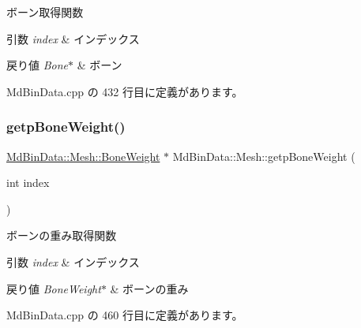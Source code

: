 ボーン取得関数 


\begin{DoxyParams}{引数}
{\em index} & インデックス \\
\hline
\end{DoxyParams}

\begin{DoxyRetVals}{戻り値}
{\em Bone$\ast$} & ボーン \\
\hline
\end{DoxyRetVals}


 Md\+Bin\+Data.\+cpp の 432 行目に定義があります。

\mbox{\label{class_md_bin_data_1_1_mesh_a43570a3e37d3b9a799df8766cefca78c}} 
\subsubsection{\texorpdfstring{getp\+Bone\+Weight()}{getpBoneWeight()}}
{\footnotesize\ttfamily \mbox{\hyperlink{class_md_bin_data_1_1_mesh_1_1_bone_weight}{Md\+Bin\+Data\+::\+Mesh\+::\+Bone\+Weight}} $\ast$ Md\+Bin\+Data\+::\+Mesh\+::getp\+Bone\+Weight (\begin{DoxyParamCaption}\item[{int}]{index }\end{DoxyParamCaption})}



ボーンの重み取得関数 


\begin{DoxyParams}{引数}
{\em index} & インデックス \\
\hline
\end{DoxyParams}

\begin{DoxyRetVals}{戻り値}
{\em Bone\+Weight$\ast$} & ボーンの重み \\
\hline
\end{DoxyRetVals}


 Md\+Bin\+Data.\+cpp の 460 行目に定義があります。

\mbox{\label{class_md_bin_data_1_1_mesh_a90d7c55722a43ed00410b18249278977}} 
